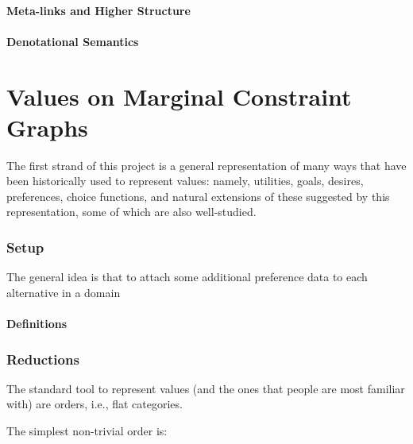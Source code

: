 \documentclass{article}
\begin{document}
	\subsection{Meta-links and Higher Structure}
	\subsection{Denotational Semantics}
	
	\part{Values on Marginal Constraint Graphs}
	
	The first strand of this project is a general representation of many ways that have been historically used to represent values: namely, utilities, goals, desires, preferences, choice functions, and natural extensions of these suggested by this representation, some of which are also well-studied. 
	
	\section{Setup}
	
	
	The general idea is that to attach some additional preference data to each alternative in a domain
	
	\subsection{Definitions}
	

	
	\section{Reductions}
	
	The standard tool to represent values (and the ones that people are most familiar with) are orders, i.e., flat categories. 
	
	The simplest non-trivial order is:
	\begin{center}
		\raisebox{0.7em}{$\mathbb B = $}~
	\end{center}
	
\end{document}
